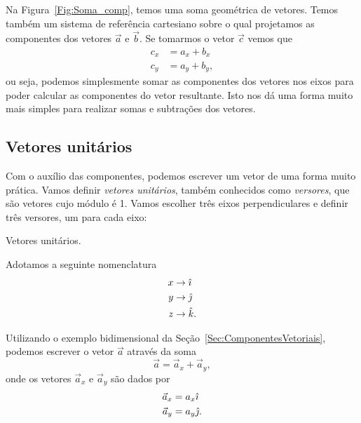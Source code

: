 Na Figura~\ref{Fig:Soma_comp}, temos uma soma geométrica de vetores. Temos também um sistema de referência cartesiano sobre o qual projetamos as componentes dos vetores $\vec{a}$ e $\vec{b}$. Se tomarmos o vetor $\vec{c}$ vemos que
\begin{align}
  c_x &= a_x + b_x \\
  c_y &= a_y + b_y,
\end{align}
%
ou seja, podemos simplesmente somar as componentes dos vetores nos eixos para poder calcular as componentes do vetor resultante. Isto nos dá uma forma muito mais simples para realizar somas e subtrações dos vetores.

\subsection{Vetores unitários}

Com o auxílio das componentes, podemos escrever um vetor de uma forma muito prática. Vamos definir \emph{vetores unitários}, também conhecidos como \emph{versores}, que são vetores cujo módulo é 1. Vamos escolher três eixos perpendiculares e definir três versores, um para cada eixo:

\begin{marginfigure}
\centering
{}
\caption{Vetores unitários.\label{Fig:vetores_unitários}}
\end{marginfigure}

\noindent{}Adotamos a seguinte nomenclatura
\begin{align}
  x &\to \hat{\imath} \\
  y &\to \hat{\jmath} \\
  z &\to \hat{k}.
\end{align}

Utilizando o exemplo bidimensional da Seção~\ref{Sec:ComponentesVetoriais}, podemos escrever o vetor $\vec{a}$ através da soma
\begin{equation}
  \vec{a} = \vec{a}_x + \vec{a}_y,
\end{equation}
%
onde os vetores $\vec{a}_x$ e $\vec{a}_y$ são dados por
\begin{align}
  \vec{a}_x &= a_x \hat{\imath} \\
  \vec{a}_y &= a_y \hat{\jmath}.
\end{align}

